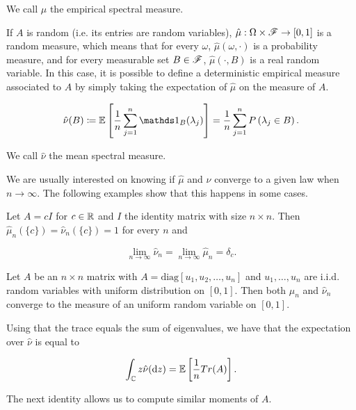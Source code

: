 We call $\hat\mu$ the empirical spectral measure. 

If $A$ is random (i.e. its entries are random variables), $\hat\mu:\Omega \times \mathscr F \to [0,1]$ is a random measure, which means that for every $\omega$, $\hat\mu(\omega, \cdot)$ is a probability measure, and for every measurable set $B\in\mathscr F$, $\hat\mu(\cdot,B)$ is a real random variable. In this case, it is possible to define a deterministic empirical measure associated to $A$ by simply taking the expectation of $\hat\mu$ on the measure of $A$.

\begin{equation*}
    \hat\nu(B) \coloneqq \E{ \frac1n \sum_{j=1}^n \mathds 1_B(\lambda_j) } = \frac1n \sum_{j=1}^n \P{\lambda_j \in B}.
\end{equation*}

We call $\hat\nu$ the mean spectral measure. 

We are usually interested on knowing if $\hat\mu$ and $\hat \nu$ converge to a given law when $n\to\infty$. The following examples show that this happens in some cases.

\begin{example} 
Let $A= c I$ for $c \in \mathbb R$ and $I$ the identity matrix with size $n\times n$. Then $\hat{\mu}_n(\{c\}) = \hat{\nu}_n(\{c\}) = 1$ for every $n$ and 

\begin{equation*}
    \lim_{n\to\infty} \hat{\nu}_n = \lim_{n\to\infty} \hat{\mu}_n = \delta_c.
\end{equation*}
\end{example}

\begin{example}
    Let $A$ be an $n \times n$ matrix with $A = \mathrm{diag}[u_1, u_2, \dots, u_n]$ and $u_1, \dots, u_n$ are i.i.d. random variables with uniform distribution on $[0,1]$. Then both $\hat \mu_n$ and $\hat \nu_n$ converge to the measure of an uniform random variable on $[0,1]$.
\end{example}

Using that the trace equals the sum of eigenvalues, we have that the expectation over  $\hat\nu$ is equal to

\begin{equation*}
    \int_\mathbb C z \hat\nu(\mathrm d z) = \mathbb E \left[  \frac1n Tr(A)  \right].
\end{equation*}

The next identity allows us to compute similar moments of $A$.

